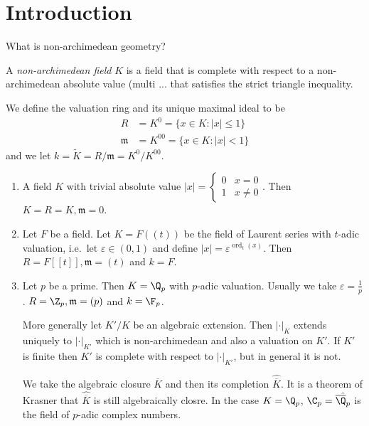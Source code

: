 \documentclass[a4paper]{article}
\begin{document}


\tableofcontents

\section{Introduction}

What is non-archimedean geometry?

\begin{definition}
  A \emph{non-archimedean field} \(K\) is a field that is complete with respect to a non-archimedean absolute value (multi ... that satisfies the strict triangle inequality.
\end{definition}

\begin{notation}
  We define the valuation ring and its unique maximal ideal to be
  \begin{align*}
    R &= K^0 = \{x \in K: |x| \leq 1\} \\
    \mathfrak m & = K^{00} = \{x \in K: |x| < 1\}
  \end{align*}
  and we let \(k = \tilde K = R/\mathfrak m = K^0/K^{00}\).
\end{notation}

\begin{eg}\leavevmode
  \begin{enumerate}
  \item A field \(K\) with trivial absolute value \(|x| =
    \begin{cases}
      0 & x = 0 \\
      1 & x \ne 0
    \end{cases}
    \). Then \(K = R = K, \mathfrak m = 0\).
  \item Let \(F\) be a field. Let \(K = F((t))\) be the field of Laurent series with \(t\)-adic valuation, i.e.\ let \(\varepsilon \in (0, 1)\) and define \(|x| = \varepsilon^{\operatorname{ord}_t(x)}\). Then \(R = F[[t]], \mathfrak m = (t)\) and \(k = F\).
  \item Let \(p\) be a prime. Then \(K = \Q_p\) with \(p\)-adic valuation. Usually we take \(\varepsilon = \frac{1}{p}\). \(R = \Z_p, \mathfrak m = (p)\) and \(k = \F_p\).

    More generally let \(K'/K\) be an algebraic extension. Then \(|\cdot|_K\) extends uniquely to \(|\cdot|_{K'}\) which is non-archimedean and also a valuation on \(K'\). If \(K'\) is finite then \(K'\) is complete with respect to \(|\cdot|_{K'}\), but in general it is not.

    We take the algebraic closure \(\overline K\) and then its completion \(\hat{\overline K}\). It is a theorem of Krasner that \(\hat{\overline K}\) is still algebraically closre. In the case \(K = \Q_p\), \(\C_p = \hat{\overline \Q_p}\) is the field of \(p\)-adic complex numbers.
  \end{enumerate}
\end{eg}
\end{document}
